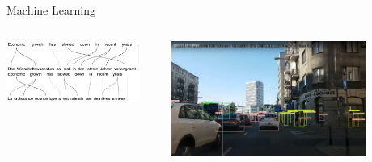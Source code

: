\documentclass[11pt,table]{beamer}
\begin{document}
\begin{frame}{Machine Learning}
\begin{columns}[T]
\begin{column}{0.5\textwidth}
\pause\centering
\includegraphics[width=0.9\textwidth]{figures/sample translations} %
\end{column}
\begin{column}{0.5\textwidth}
\centering \pause
\includegraphics[width=0.8\textwidth]{figures/yolov7e6.png}
\end{column}
\end{columns}


\end{frame}
\end{document}
